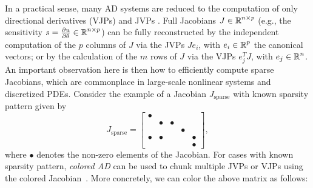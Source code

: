 In a practical sense, many AD systems are reduced to the computation of only directional derivatives (VJPs) and JVPs \cite{Griewank:2008kh}.
Full Jacobians $J \in \operatorname{\mathbb{R}}^{n \times p}$ (e.g., the sensitivity $s = \frac{\partial u}{\partial \theta} \in \operatorname{\mathbb{R}}^{n \times p}$) can be fully reconstructed by the independent computation of the $p$ columns of $J$ via the JVPs $J e_i$, with $e_i \in \operatorname{\mathbb{R}}^p$ the canonical vectors; or by the calculation of the $m$ rows of $J$ via the VJPs $e_j^T J$, with $e_j \in \operatorname{\mathbb{R}}^n$.
An important observation here is then how to efficiently compute sparse Jacobians, which are commonplace in large-scale nonlinear systems and discretized PDEs. 
Consider the example of a Jacobian ${J}_{\text{sparse}}$ with known sparsity pattern given by
\begin{equation}
    {J}_{\text{sparse}} = \begin{bmatrix}
        \bullet &         &         &         &         \\
                & \bullet & \bullet &         &         \\
                &         &         & \bullet &         \\
        \bullet & \bullet &         &         & \bullet \\
                &         &         &         & \bullet
    \end{bmatrix},
\end{equation}
where $\bullet$ denotes the non-zero elements of the Jacobian. 
For cases with known sparsity pattern, \textit{colored AD} can be used to chunk multiple JVPs or VJPs using the colored Jacobian~\cite{gebremedhin2005color}. 
More concretely, we can color the above matrix as follows:
